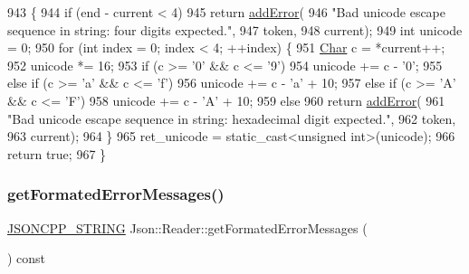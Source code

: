 \begin{DoxyCode}
943                                                                     \{
944   \textcolor{keywordflow}{if} (end - current < 4)
945     \textcolor{keywordflow}{return} \hyperlink{class_json_1_1_reader_af02176a1d2786b4415bbb00a1b10bb6b}{addError}(
946         \textcolor{stringliteral}{"Bad unicode escape sequence in string: four digits expected."},
947         token,
948         current);
949   \textcolor{keywordtype}{int} unicode = 0;
950   \textcolor{keywordflow}{for} (\textcolor{keywordtype}{int} index = 0; index < 4; ++index) \{
951     \hyperlink{class_json_1_1_reader_a3eec9118f3e9a672ba8348c3a79d0f45}{Char} c = *current++;
952     unicode *= 16;
953     \textcolor{keywordflow}{if} (c >= \textcolor{charliteral}{'0'} && c <= \textcolor{charliteral}{'9'})
954       unicode += c - \textcolor{charliteral}{'0'};
955     \textcolor{keywordflow}{else} \textcolor{keywordflow}{if} (c >= \textcolor{charliteral}{'a'} && c <= \textcolor{charliteral}{'f'})
956       unicode += c - \textcolor{charliteral}{'a'} + 10;
957     \textcolor{keywordflow}{else} \textcolor{keywordflow}{if} (c >= \textcolor{charliteral}{'A'} && c <= \textcolor{charliteral}{'F'})
958       unicode += c - \textcolor{charliteral}{'A'} + 10;
959     \textcolor{keywordflow}{else}
960       \textcolor{keywordflow}{return} \hyperlink{class_json_1_1_reader_af02176a1d2786b4415bbb00a1b10bb6b}{addError}(
961           \textcolor{stringliteral}{"Bad unicode escape sequence in string: hexadecimal digit expected."},
962           token,
963           current);
964   \}
965   ret\_unicode = \textcolor{keyword}{static\_cast<}\textcolor{keywordtype}{unsigned} \textcolor{keywordtype}{int}\textcolor{keyword}{>}(unicode);
966   \textcolor{keywordflow}{return} \textcolor{keyword}{true};
967 \}
\end{DoxyCode}
\mbox{\label{class_json_1_1_reader_a791cbc5afd1bef1631e07239dc452c79}} 
\subsubsection{\texorpdfstring{get\+Formated\+Error\+Messages()}{getFormatedErrorMessages()}}
{\footnotesize\ttfamily \hyperlink{json_8h_a1e723f95759de062585bc4a8fd3fa4be}{J\+S\+O\+N\+C\+P\+P\+\_\+\+S\+T\+R\+I\+NG} Json\+::\+Reader\+::get\+Formated\+Error\+Messages (\begin{DoxyParamCaption}{ }\end{DoxyParamCaption}) const}



